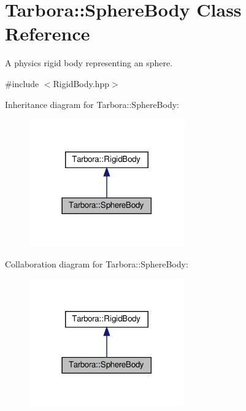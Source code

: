 \hypertarget{classTarbora_1_1SphereBody}{}\section{Tarbora\+:\+:Sphere\+Body Class Reference}
\label{classTarbora_1_1SphereBody}


A physics rigid body representing an sphere.  




{\ttfamily \#include $<$Rigid\+Body.\+hpp$>$}



Inheritance diagram for Tarbora\+:\+:Sphere\+Body\+:\nopagebreak
\begin{figure}[H]
\begin{center}
\leavevmode
\includegraphics[width=189pt]{classTarbora_1_1SphereBody__inherit__graph}
\end{center}
\end{figure}


Collaboration diagram for Tarbora\+:\+:Sphere\+Body\+:\nopagebreak
\begin{figure}[H]
\begin{center}
\leavevmode
\includegraphics[width=189pt]{classTarbora_1_1SphereBody__coll__graph}
\end{center}
\end{figure}
